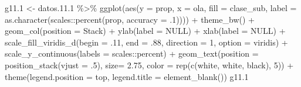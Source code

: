 \documentclass[
  12pt,
]{book}
\newenvironment{Shaded}{\begin{snugshade}}{\end{snugshade}}
\newcommand{\AttributeTok}[1]{\textcolor[rgb]{0.77,0.63,0.00}{#1}}
\newcommand{\ConstantTok}[1]{\textcolor[rgb]{0.00,0.00,0.00}{#1}}
\newcommand{\DecValTok}[1]{\textcolor[rgb]{0.00,0.00,0.81}{#1}}
\newcommand{\FloatTok}[1]{\textcolor[rgb]{0.00,0.00,0.81}{#1}}
\newcommand{\FunctionTok}[1]{\textcolor[rgb]{0.00,0.00,0.00}{#1}}
\newcommand{\NormalTok}[1]{#1}
\newcommand{\OtherTok}[1]{\textcolor[rgb]{0.56,0.35,0.01}{#1}}
\newcommand{\SpecialCharTok}[1]{\textcolor[rgb]{0.00,0.00,0.00}{#1}}
\newcommand{\StringTok}[1]{\textcolor[rgb]{0.31,0.60,0.02}{#1}}
\begin{document}
\begin{Shaded}
\begin{Highlighting}[]
\NormalTok{g11}\FloatTok{.1} \OtherTok{\textless{}{-}}\NormalTok{ datos.}\FloatTok{11.1} \SpecialCharTok{\%\textgreater{}\%} 
  \FunctionTok{ggplot}\NormalTok{(}\FunctionTok{aes}\NormalTok{(}\AttributeTok{y =}\NormalTok{ prop, }\AttributeTok{x =}\NormalTok{ ola, }\AttributeTok{fill =}\NormalTok{ clase\_sub, }
             \AttributeTok{label =} \FunctionTok{as.character}\NormalTok{(scales}\SpecialCharTok{::}\FunctionTok{percent}\NormalTok{(prop, }\AttributeTok{accuracy =}\NormalTok{ .}\DecValTok{1}\NormalTok{)))) }\SpecialCharTok{+} 
  \FunctionTok{theme\_bw}\NormalTok{() }\SpecialCharTok{+} 
  \FunctionTok{geom\_col}\NormalTok{(}\AttributeTok{position =} \StringTok{\textquotesingle{}Stack\textquotesingle{}}\NormalTok{) }\SpecialCharTok{+}
  \FunctionTok{ylab}\NormalTok{(}\AttributeTok{label =} \ConstantTok{NULL}\NormalTok{) }\SpecialCharTok{+}
  \FunctionTok{xlab}\NormalTok{(}\AttributeTok{label =} \ConstantTok{NULL}\NormalTok{) }\SpecialCharTok{+}
  \FunctionTok{scale\_fill\_viridis\_d}\NormalTok{(}\AttributeTok{begin =}\NormalTok{ .}\DecValTok{11}\NormalTok{, }\AttributeTok{end =}\NormalTok{ .}\DecValTok{88}\NormalTok{, }\AttributeTok{direction =} \DecValTok{1}\NormalTok{, }\AttributeTok{option =} \StringTok{\textquotesingle{}viridis\textquotesingle{}}\NormalTok{) }\SpecialCharTok{+}
  \FunctionTok{scale\_y\_continuous}\NormalTok{(}\AttributeTok{labels =}\NormalTok{ scales}\SpecialCharTok{::}\NormalTok{percent) }\SpecialCharTok{+} 
  \FunctionTok{geom\_text}\NormalTok{(}\AttributeTok{position =} \FunctionTok{position\_stack}\NormalTok{(}\AttributeTok{vjust =}\NormalTok{ .}\DecValTok{5}\NormalTok{),}
            \AttributeTok{size=} \FloatTok{2.75}\NormalTok{, }\AttributeTok{color =} \FunctionTok{rep}\NormalTok{(}\FunctionTok{c}\NormalTok{(}\StringTok{\textquotesingle{}white\textquotesingle{}}\NormalTok{, }\StringTok{\textquotesingle{}white\textquotesingle{}}\NormalTok{, }\StringTok{\textquotesingle{}black\textquotesingle{}}\NormalTok{), }\DecValTok{5}\NormalTok{)) }\SpecialCharTok{+} 
  \FunctionTok{theme}\NormalTok{(}\AttributeTok{legend.position =} \StringTok{\textquotesingle{}top\textquotesingle{}}\NormalTok{,}
        \AttributeTok{legend.title =} \FunctionTok{element\_blank}\NormalTok{())}
\NormalTok{g11}\FloatTok{.1}
\end{Highlighting}
\end{Shaded}
\end{document}
